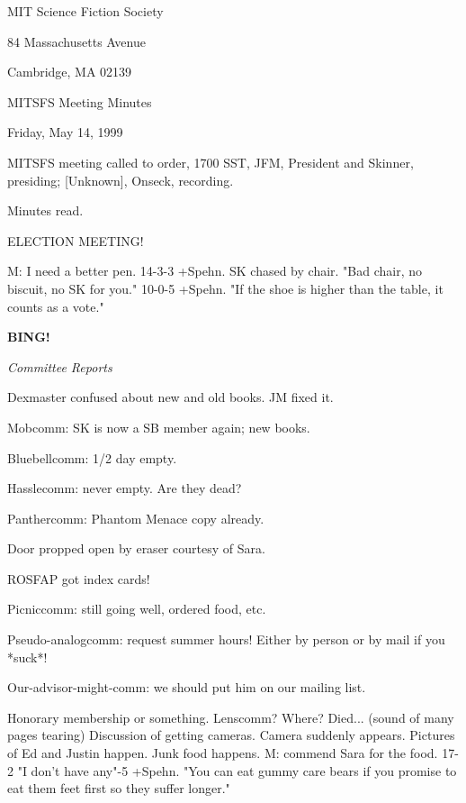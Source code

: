 \documentclass[12pt]{article}
\newcommand{\bing}{{\bf BING!} }
\newcommand{\goto}[1]{\bing \vskip 12pt \centerline{{\em{#1}}}}
\begin{document}
\begin{center}

MIT Science Fiction Society 

84 Massachusetts Avenue

Cambridge, MA 02139

\vspace{12pt}

MITSFS Meeting Minutes 

Friday, May 14, 1999

\end{center}
 
\vspace{18pt}

\setlength{\parskip}{6pt}

\noindent
MITSFS meeting called to order, 1700 SST,
JFM, President and Skinner, presiding; [Unknown], Onseck, recording.

Minutes read.

ELECTION MEETING!

M: I need a better pen. 14-3-3 +Spehn.
SK chased by chair.
"Bad chair, no biscuit, no SK for you." 10-0-5 +Spehn.
"If the shoe is higher than the table, it counts as a vote."

\goto{Committee Reports}

Dexmaster confused about new and old books. JM fixed it.

Mobcomm: SK is now a SB member again; new books.

Bluebellcomm: 1/2 day empty.

Hasslecomm: never empty. Are they dead?

Panthercomm: Phantom Menace copy already.

Door propped open by eraser courtesy of Sara.

ROSFAP got index cards!

Picniccomm: still going well, ordered food, etc.

Pseudo-analogcomm: request summer hours! Either by person or by mail if you *suck*!

Our-advisor-might-comm: we should put him on our mailing list.

Honorary membership or something.
Lenscomm? Where? Died...
(sound of many pages tearing)
Discussion of getting cameras.
Camera suddenly appears.
Pictures of Ed and Justin happen.
Junk food happens.
M: commend Sara for the food. 17-2 "I don't have any"-5 +Spehn.
"You can eat gummy care bears if you promise to eat them feet first so they suffer longer."
\end{document}
